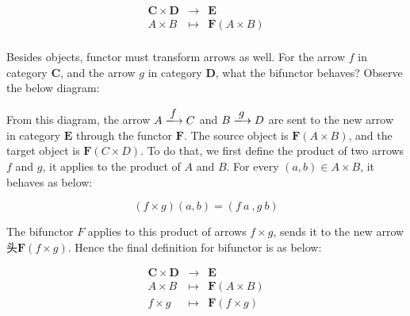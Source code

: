 \documentclass{article}
\begin{document}
\[
\begin{array}{rcl}
\pmb{C} \times \pmb{D} & \longrightarrow & \pmb{E} \\
A \times B & \longmapsto & \mathbf{F}(A \times B) \\
\end{array}
\]

Besides objects, functor must transform arrows as well. For the arrow $f$ in category $\pmb{C}$, and the arrow $g$ in category $\pmb{D}$, what the bifunctor behaves? Observe the below diagram:

\begin{center}
\end{center}

From this diagram, the arrow $A \arrowto{f} C$ and $B \arrowto{g} D$ are sent to the new arrow in category $\pmb{E}$ through the functor $\mathbf{F}$. The source object is $\mathbf{F}(A \times B)$, and the target object is $\mathbf{F}(C \times D)$. To do that, we first define the product of two arrows $f$ and $g$, it applies to the product of $A$ and $B$. For every $(a, b) \in A \times B$, it behaves as below:

\[
(f \times g)(a, b) = (f\ a\ , g\ b)
\]

The bifunctor $F$ applies to this product of arrows $f \times g$, sends it to the new arrow 头$\mathbf{F}(f \times g)$. Hence the final definition for bifunctor is as below:

\[
\begin{array}{rcl}
\pmb{C} \times \pmb{D} & \longrightarrow & \pmb{E} \\
A \times B & \longmapsto & \mathbf{F}(A \times B) \\
f \times g & \longmapsto & \mathbf{F}(f \times g) \\
\end{array}
\]
\end{document}

